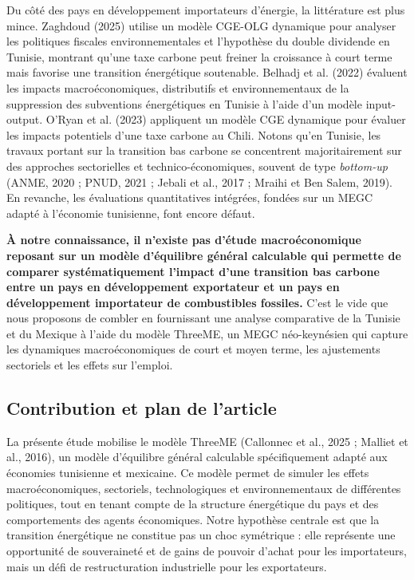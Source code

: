\documentclass[12pt, a4paper]{article}
\begin{document}
Du côté des pays en développement importateurs d'énergie, la littérature est plus mince. Zaghdoud (2025) utilise un modèle CGE-OLG dynamique pour analyser les politiques fiscales environnementales et l'hypothèse du double dividende en Tunisie, montrant qu'une taxe carbone peut freiner la croissance à court terme mais favorise une transition énergétique soutenable. Belhadj et al. (2022) évaluent les impacts macroéconomiques, distributifs et environnementaux de la suppression des subventions énergétiques en Tunisie à l'aide d'un modèle input-output. O'Ryan et al. (2023) appliquent un modèle CGE dynamique pour évaluer les impacts potentiels d'une taxe carbone au Chili. Notons qu'en Tunisie, les travaux portant sur la transition bas carbone se concentrent majoritairement sur des approches sectorielles et technico-économiques, souvent de type \textit{bottom-up} (ANME, 2020 ; PNUD, 2021 ; Jebali et al., 2017 ; Mraihi et Ben Salem, 2019). En revanche, les évaluations quantitatives intégrées, fondées sur un MEGC adapté à l'économie tunisienne, font encore défaut.

\textbf{À notre connaissance, il n'existe pas d'étude macroéconomique reposant sur un modèle d'équilibre général calculable qui permette de comparer systématiquement l'impact d'une transition bas carbone entre un pays en développement exportateur et un pays en développement importateur de combustibles fossiles.} C'est le vide que nous proposons de combler en fournissant une analyse comparative de la Tunisie et du Mexique à l'aide du modèle ThreeME, un MEGC néo-keynésien qui capture les dynamiques macroéconomiques de court et moyen terme, les ajustements sectoriels et les effets sur l'emploi.

\subsection{Contribution et plan de l'article}

La présente étude mobilise le modèle ThreeME (Callonnec et al., 2025 ; Malliet et al., 2016), un modèle d'équilibre général calculable spécifiquement adapté aux économies tunisienne et mexicaine. Ce modèle permet de simuler les effets macroéconomiques, sectoriels, technologiques et environnementaux de différentes politiques, tout en tenant compte de la structure énergétique du pays et des comportements des agents économiques. Notre hypothèse centrale est que la transition énergétique ne constitue pas un choc symétrique : elle représente une opportunité de souveraineté et de gains de pouvoir d'achat pour les importateurs, mais un défi de restructuration industrielle pour les exportateurs.
\end{document}
